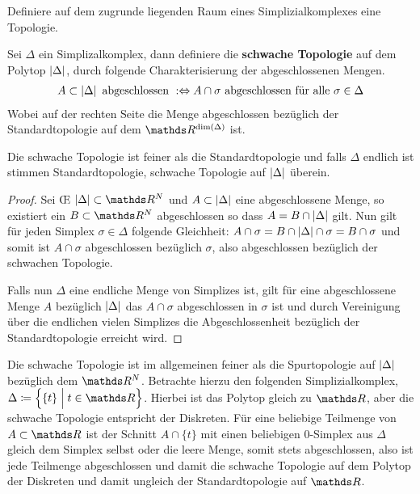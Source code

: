 Definiere auf dem zugrunde liegenden Raum eines Simplizialkomplexes eine 
Topologie.

\begin{Def}
	Sei $\Delta$ ein Simplizalkomplex, dann definiere die
	\textbf{schwache Topologie} auf dem Polytop $\left| \Delta \right|$,
	durch folgende Charakterisierung der abgeschlossenen Mengen.
	\begin{gather*}
          A \subset \left| \Delta \right| \text{ abgeschlossen }
          :\Leftrightarrow A \cap \sigma \text{ abgeschlossen für alle
          } \sigma \in \Delta
	\end{gather*}
	Wobei auf der rechten Seite die Menge abgeschlossen bezüglich der
	Standardtopologie auf dem $\R^{\dim(\Delta)}$ ist.
\end{Def}

\begin{Lem}
  Die schwache Topologie ist feiner als die Standardtopologie und
  falls $\Delta$ endlich ist stimmen Standardtopologie, schwache
  Topologie auf $\left| \Delta \right|$ überein.
  \begin{proof}
    Sei \OE\; $\gr{\Delta} \subset \R^N$ und $A \subset \left| \Delta \right|$
    eine abgeschlossene Menge, so existiert ein $B \subset \R^N$
    abgeschlossen so dass $A = B \cap \left| \Delta \right|$ gilt. Nun gilt für
    jeden Simplex $\sigma \in \Delta$ folgende Gleichheit:
    $A \cap \sigma = B \cap \left| \Delta \right| \cap \sigma = B \cap \sigma$
    und somit ist $A \cap \sigma$ abgeschlossen bezüglich $\sigma$,
    also abgeschlossen bezüglich der schwachen Topologie.
		
    Falls nun $\Delta$ eine endliche Menge von Simplizes ist, gilt für
    eine abgeschlossene Menge $A$ bezüglich $\left| \Delta \right|$ das
    $A \cap \sigma$ abgeschlossen in $\sigma$ ist und durch
    Vereinigung über die endlichen vielen Simplizes die
    Abgeschlossenheit bezüglich der Standardtopologie erreicht wird.
  \end{proof}
\end{Lem}

\begin{Bem}
  Die schwache Topologie ist im allgemeinen feiner als die
  Spurtopologie auf $\left| \Delta \right|$ bezüglich dem $\R^N$. Betrachte
  hierzu den folgenden Simplizialkomplex,
  $\Delta \coloneqq \set{ \{t\} }{t \in \R}$.  Hierbei ist das Polytop
  gleich zu $\R$, aber die schwache Topologie entspricht der
  Diskreten. Für eine beliebige Teilmenge von $A \subset \R$ ist der
  Schnitt $A \cap \{ t \}$ mit einen beliebigen $0$-Simplex aus
  $\Delta$ gleich dem Simplex selbst oder die leere Menge, somit stets
  abgeschlossen, also ist jede Teilmenge abgeschlossen und damit die
  schwache Topologie auf dem Polytop der Diskreten und damit ungleich
  der Standardtopologie auf $\R$.
\end{Bem}


